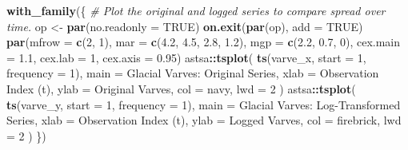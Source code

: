 \documentclass[
  10pt,
]{extarticle}
\newenvironment{Shaded}{\begin{snugshade}}{\end{snugshade}}
\newcommand{\AttributeTok}[1]{\textcolor[rgb]{0.13,0.29,0.53}{#1}}
\newcommand{\CommentTok}[1]{\textcolor[rgb]{0.56,0.35,0.01}{\textit{#1}}}
\newcommand{\ConstantTok}[1]{\textcolor[rgb]{0.56,0.35,0.01}{#1}}
\newcommand{\DecValTok}[1]{\textcolor[rgb]{0.00,0.00,0.81}{#1}}
\newcommand{\FloatTok}[1]{\textcolor[rgb]{0.00,0.00,0.81}{#1}}
\newcommand{\FunctionTok}[1]{\textcolor[rgb]{0.13,0.29,0.53}{\textbf{#1}}}
\newcommand{\NormalTok}[1]{#1}
\newcommand{\OtherTok}[1]{\textcolor[rgb]{0.56,0.35,0.01}{#1}}
\newcommand{\SpecialCharTok}[1]{\textcolor[rgb]{0.81,0.36,0.00}{\textbf{#1}}}
\newcommand{\StringTok}[1]{\textcolor[rgb]{0.31,0.60,0.02}{#1}}
\begin{document}
\begin{Shaded}
\begin{Highlighting}[]
\FunctionTok{with\_family}\NormalTok{(\{}
  \CommentTok{\# Plot the original and logged series to compare spread over time.}
\NormalTok{  op }\OtherTok{\textless{}{-}} \FunctionTok{par}\NormalTok{(}\AttributeTok{no.readonly =} \ConstantTok{TRUE}\NormalTok{)}
  \FunctionTok{on.exit}\NormalTok{(}\FunctionTok{par}\NormalTok{(op), }\AttributeTok{add =} \ConstantTok{TRUE}\NormalTok{)}
  \FunctionTok{par}\NormalTok{(}\AttributeTok{mfrow =} \FunctionTok{c}\NormalTok{(}\DecValTok{2}\NormalTok{, }\DecValTok{1}\NormalTok{), }\AttributeTok{mar =} \FunctionTok{c}\NormalTok{(}\FloatTok{4.2}\NormalTok{, }\FloatTok{4.5}\NormalTok{, }\FloatTok{2.8}\NormalTok{, }\FloatTok{1.2}\NormalTok{), }\AttributeTok{mgp =} \FunctionTok{c}\NormalTok{(}\FloatTok{2.2}\NormalTok{, }\FloatTok{0.7}\NormalTok{, }\DecValTok{0}\NormalTok{), }\AttributeTok{cex.main =} \FloatTok{1.1}\NormalTok{, }\AttributeTok{cex.lab =} \DecValTok{1}\NormalTok{, }\AttributeTok{cex.axis =} \FloatTok{0.95}\NormalTok{)}
\NormalTok{  astsa}\SpecialCharTok{::}\FunctionTok{tsplot}\NormalTok{(}
    \FunctionTok{ts}\NormalTok{(varve\_x, }\AttributeTok{start =} \DecValTok{1}\NormalTok{, }\AttributeTok{frequency =} \DecValTok{1}\NormalTok{),}
    \AttributeTok{main =} \StringTok{\textquotesingle{}Glacial Varves: Original Series\textquotesingle{}}\NormalTok{,}
    \AttributeTok{xlab =} \StringTok{\textquotesingle{}Observation Index (t)\textquotesingle{}}\NormalTok{,}
    \AttributeTok{ylab =} \StringTok{\textquotesingle{}Original Varves\textquotesingle{}}\NormalTok{,}
    \AttributeTok{col =} \StringTok{\textquotesingle{}navy\textquotesingle{}}\NormalTok{,}
    \AttributeTok{lwd =} \DecValTok{2}
\NormalTok{  )}
\NormalTok{  astsa}\SpecialCharTok{::}\FunctionTok{tsplot}\NormalTok{(}
    \FunctionTok{ts}\NormalTok{(varve\_y, }\AttributeTok{start =} \DecValTok{1}\NormalTok{, }\AttributeTok{frequency =} \DecValTok{1}\NormalTok{),}
    \AttributeTok{main =} \StringTok{\textquotesingle{}Glacial Varves: Log{-}Transformed Series\textquotesingle{}}\NormalTok{,}
    \AttributeTok{xlab =} \StringTok{\textquotesingle{}Observation Index (t)\textquotesingle{}}\NormalTok{,}
    \AttributeTok{ylab =} \StringTok{\textquotesingle{}Logged Varves\textquotesingle{}}\NormalTok{,}
    \AttributeTok{col =} \StringTok{\textquotesingle{}firebrick\textquotesingle{}}\NormalTok{,}
    \AttributeTok{lwd =} \DecValTok{2}
\NormalTok{  )}
\NormalTok{\})}
\end{Highlighting}
\end{Shaded}
\end{document}
